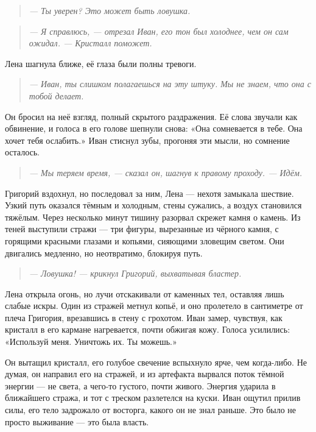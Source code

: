 \documentclass[12pt,a4paper]{book}
\newenvironment{dialogue}{\begin{quote}\itshape}{\end{quote}} %
\begin{document}
\begin{dialogue}
--- Ты уверен? Это может быть ловушка.
\end{dialogue}

\begin{dialogue}
--- Я справлюсь, --- отрезал Иван, его тон был холоднее, чем он сам ожидал. --- Кристалл поможет.
\end{dialogue}

Лена шагнула ближе, её глаза были полны тревоги.

\begin{dialogue}
--- Иван, ты слишком полагаешься на эту штуку. Мы не знаем, что она с тобой делает.
\end{dialogue}

Он бросил на неё взгляд, полный скрытого раздражения. Её слова звучали как обвинение, и голоса в его голове шепнули снова: «Она сомневается в тебе. Она хочет тебя ослабить.» Иван стиснул зубы, прогоняя эти мысли, но сомнение осталось.

\begin{dialogue}
--- Мы теряем время, --- сказал он, шагнув к правому проходу. --- Идём.
\end{dialogue}

Григорий вздохнул, но последовал за ним, Лена --- нехотя замыкала шествие. Узкий путь оказался тёмным и холодным, стены сужались, а воздух становился тяжёлым. Через несколько минут тишину разорвал скрежет камня о камень. Из теней выступили стражи --- три фигуры, вырезанные из чёрного камня, с горящими красными глазами и копьями, сияющими зловещим светом. Они двигались медленно, но неотвратимо, блокируя путь.

\begin{dialogue}
--- Ловушка! --- крикнул Григорий, выхватывая бластер.
\end{dialogue}

Лена открыла огонь, но лучи отскакивали от каменных тел, оставляя лишь слабые искры. Один из стражей метнул копьё, и оно пролетело в сантиметре от плеча Григория, врезавшись в стену с грохотом. Иван замер, чувствуя, как кристалл в его кармане нагревается, почти обжигая кожу. Голоса усилились: «Используй меня. Уничтожь их. Ты можешь.»

Он вытащил кристалл, его голубое свечение вспыхнуло ярче, чем когда-либо. Не думая, он направил его на стражей, и из артефакта вырвался поток тёмной энергии --- не света, а чего-то густого, почти живого. Энергия ударила в ближайшего стража, и тот с треском разлетелся на куски. Иван ощутил прилив силы, его тело задрожало от восторга, какого он не знал раньше. Это было не просто выживание --- это была власть.
\end{document}
